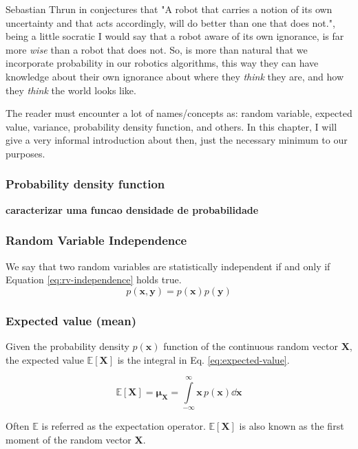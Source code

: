 \documentclass[12pt]{article}
\newcommand{\brac}[1]{\left[#1\right]} %
\newcommand{\parentheses}[1]{\left(#1\right)}
\newcommand{\pr}[1]{p\parentheses{#1}}
\newcommand{\Int}[4][x]{\int\limits_{#2}^{#3} #4 \dd #1}
\newcommand{\mb}[1]{{\boldsymbol{#1}}} %
\newcommand{\expv}[1]{\mathbb{E}\brac{#1}} %
\newcommand{\magenta}[1]{\color{magenta}#1\color{black}}
\begin{document}
Sebastian Thrun in \cite{thrun2000probabilistic} conjectures that "A robot that carries a notion of its own uncertainty and that acts accordingly, will do better than one that does not.", being a little socratic I would say that a robot aware of its own ignorance, is far more \textit{wise} than a robot that does not. So, is more than natural that we incorporate probability in our robotics algorithms, this way they can have knowledge about their own ignorance about where they \textit{think} they are, and how they \textit{think} the world looks like.

The reader must encounter a lot of names/concepts as: random variable, expected value, variance, probability density function, and others. In this chapter, I will give a very informal introduction about then, just the necessary minimum to our purposes.

\subsubsection{Probability density function}
\magenta{\textbf{caracterizar uma funcao densidade de probabilidade}}

\subsubsection{Random Variable Independence}
We say that two random variables are statistically independent if and only if Equation \ref{eq:rv-independence} holds true.
\begin{equation}
    \pr{\mb{x}, \mb{y}} = \pr{\mb{x}}\pr{\mb{y}}
    \label{eq:rv-independence}
\end{equation}

\subsubsection{Expected value (mean)}
Given the probability density $\pr{\mb{x}}$ function of the continuous random vector $\mb{X}$, the expected value $\expv{\mb{X}}$ is the integral in Eq. \ref{eq:expected-value}.

\begin{equation}
    \expv{\mb{X}} = \mb{\mu_X} = \Int[\mb{x}]{-\infty}{\infty}{\mb{x} \, \pr{\mb{x}}}
    \label{eq:expected-value}
\end{equation}

Often $\mathbb{E}$ is referred as the expectation operator. $\expv{\mb{X}}$ is also known as the first moment of the random vector $\mb{X}$.
\end{document}
